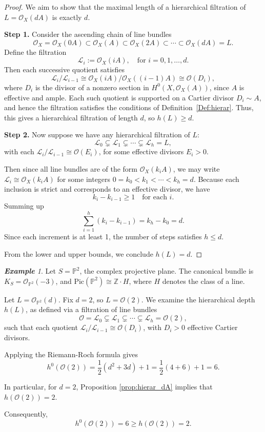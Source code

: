 \documentclass[14pt]{amsart}
\theoremstyle{plain}
\theoremstyle{definition}
\theoremstyle{remark}
\newtheorem{exam}[thm]{\bf Example}
\theoremstyle{example}
\def \P{\mathbb{P}}
\def \Z{\mathbb{Z}}
\def \L{\mathcal{L}}
\def \O{\mathcal{O}}
\def \Pic{\mathrm{Pic}}
\begin{document}
\begin{proof}
We aim to show that the maximal length of a hierarchical filtration of $L=\O_X(dA)$ is exactly $d$.

\textbf{Step 1.}
Consider the ascending chain of line bundles
$$\O_X=\O_X(0A)\subset\O_X(A)\subset\O_X(2A)\subset\cdots\subset\O_X(dA)=L.$$
Define the filtration
$$\L_i:=\O_X(iA),\quad \text{for } i=0,1,\ldots,d.$$
Then each successive quotient satisfies
$$\L_i / \L_{i-1} \cong \O_X(iA)/\O_X((i-1)A) \cong \O(D_i),$$
where $ D_i $ is the divisor of a nonzero section in $H^0(X,\O_X(A))$, since $A$ is effective and ample. Each such quotient is supported on a Cartier divisor $D_i\sim A$, and hence the filtration satisfies the conditions of Definition~\ref{Def:hierar}. Thus, this gives a hierarchical filtration of length $d$, so $h(L)\geq d.$

\textbf{Step 2.} %
Now suppose we have any hierarchical filtration of $L$:
$$\L_0 \subsetneq \L_1 \subsetneq \cdots \subsetneq \L_h = L,$$
with each $\L_i/\L_{i-1}\cong\O(E_i)$, for some effective divisors $E_i>0$.

Then since all line bundles are of the form $\O_X(k_i A)$, we may write $\L_i\cong\O_X(k_i A)$ for some integers $0=k_0<k_1<\cdots <k_h=d$. Because each inclusion is strict and corresponds to an effective divisor, we have
$$k_i-k_{i-1}\geq 1\quad\text{for each } i.$$
Summing up
$$\sum_{i=1}^h(k_i-k_{i-1})=k_h-k_0=d.$$
Since each increment is at least 1, the number of steps satisfies $h\leq d.$

From the lower and upper bounds, we conclude $h(L)=d.$
\end{proof}

\begin{exam}
Let $S=\P^2$, the complex projective plane. The canonical bundle is $K_S=\O_{\P^2}(-3)$, and $\Pic(\P^2)\cong\Z\cdot H$, where $H$ denotes the class of a line.

Let $L=\O_{\P^2}(d)$. Fix $d=2$, so $L=\O(2)$. We examine the hierarchical depth $h(L)$, as defined via a filtration of line bundles
$$\O=\L_0\subsetneq\L_1\subsetneq\cdots\subsetneq \L_h=\O(2),$$
such that each quotient $ \L_i / \L_{i-1} \cong \O(D_i) $, with $ D_i > 0 $ effective Cartier divisors.

Applying the Riemann-Roch formula gives
$$h^0(\O(2))=\frac{1}{2}(d^2 + 3d)+1=\frac{1}{2}(4+6)+1=6.$$

In particular, for $d=2$, Proposition \ref{prop:hierar_dA} implies that $h(\O(2))=2.$

Consequently,
$$h^0(\O(2))=6\geq h(\O(2))=2.$$
\end{exam}
\end{document}
